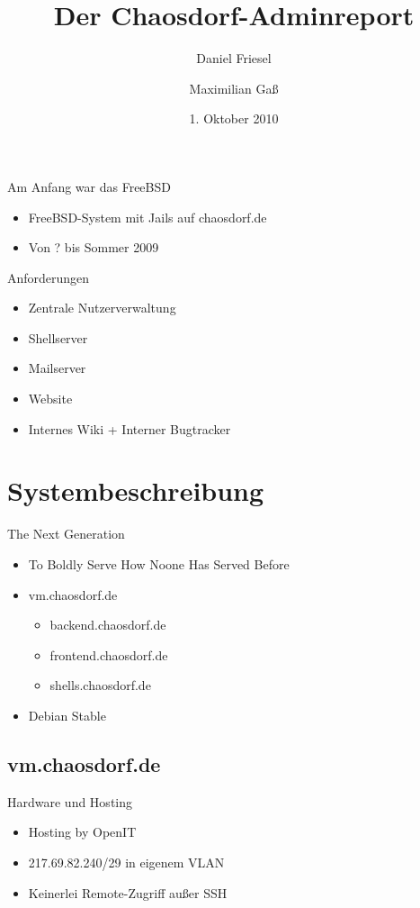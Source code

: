 \documentclass{beamer}
\title[Der Chaosdorf-Adminreport]
	{Der Chaosdorf-Adminreport}
\author{Daniel Friesel \and Maximilian Gaß}
\institute{Chaosdorf}
\date{1. Oktober 2010}
\begin{document}
\begin{frame}
	\titlepage
\end{frame}


\begin{frame}{Am Anfang war das FreeBSD}
	\begin{itemize}
		\item FreeBSD-System mit Jails auf chaosdorf.de
		\item Von ? bis Sommer 2009
	\end{itemize}
\end{frame}

\begin{frame}{Anforderungen}
	\begin{itemize}
		\item Zentrale Nutzerverwaltung
		\item Shellserver
		\item Mailserver
		\item Website
		\item Internes Wiki + Interner Bugtracker
	\end{itemize}
\end{frame}

\section{Systembeschreibung}

\begin{frame}{The Next Generation}
	\begin{itemize}
		\item To Boldly Serve How Noone Has Served Before
	\end{itemize}
	\begin{itemize}
		\item vm.chaosdorf.de
		\begin{itemize}
			\item backend.chaosdorf.de
			\item frontend.chaosdorf.de
			\item shells.chaosdorf.de
		\end{itemize}
	\end{itemize}
	\begin{itemize}
		\item Debian Stable
	\end{itemize}
\end{frame}


\subsection{vm.chaosdorf.de}
\begin{frame}{Hardware und Hosting}
	\begin{itemize}
		\item Hosting by OpenIT
		\item 217.69.82.240/29 in eigenem VLAN
		\item Keinerlei Remote-Zugriff außer SSH
	\end{itemize}
\end{frame}
\end{document}
